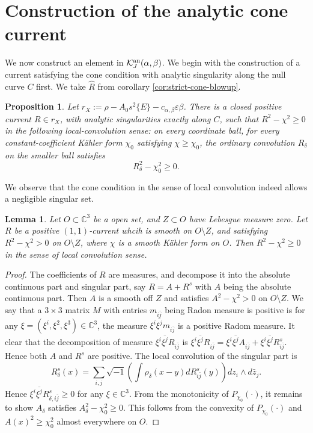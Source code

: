 \documentclass[reqno]{amsart}
\theoremstyle{remark}
\def\C{\mathbb{C}}
\newcommand{\cab}{c_{\alpha,\beta}}
\def\cK{{\mathcal K}}
\theoremstyle{plain}
\newtheorem{prop}[thm]{Proposition}
\newtheorem{lemma}[thm]{Lemma}
\begin{document}
\section{Construction of the analytic cone current}
We now construct an element in $\cK_{J}^{\rm an}(\alpha,\beta)$. We begin with the construction of a current satisfying the cone condition with analytic singularity along the null curve $C$ first. We take $\widehat{R}$ from corollary \ref{cor:strict-cone-blowup}.

\begin{prop}
\label{prop:analytic-descent}
Let $ r_X:=\rho-A_0s^2\{E\}-\cab\varepsilon\beta$.
There is a closed positive current $R\in r_X$, with analytic
singularities exactly along $C$, such that $ R^2-\chi^2\geq0$ 
in the following local-convolution sense: on every coordinate ball,
for every constant-coefficient K\"ahler form
$\chi_0$ satisfying $\chi\geq\chi_0$, the ordinary convolution
$R_\delta$ on the smaller ball satisfies
\[
 R_\delta^2-\chi_0^2\geq0.
\]
\end{prop}

We observe that the cone condition in the sense of local convolution indeed allows a negligible singular set.
\begin{lemma}\label{lem:convolution-negligible-set}Let $O\subset \C^3$ be a open set, and $Z\subset O$ have Lebesgue measure zero. Let $R$ be a positive $(1,1)$-current whcih is smooth on $O\setminus Z$, and satisfying $R^2-\chi^2>0$ on $O\setminus Z$, where $\chi$ is a smooth K\"ahler form on $O$. Then $R^2-\chi^2\geq 0$ in the sense of local convolution sense.   
\end{lemma}
\begin{proof}
    The coefficients of $R$ are measures, and decompose it into the absolute continuous part and singular part, say $R=A+R^s$ with $A$ being the absolute continuous part. Then $A$ is a smooth off $Z$ and satisfies $A^2-\chi^2>0$ on $O\setminus Z$. We say that a $3\times 3$ matrix $M$ with entries $m_{i\bar j}$ being Radon measure is positive is for any $\xi=(\xi^i,\xi^2,\xi^3)\in \C^3$, the measure $\xi^i\overline{\xi^j}m_{i\bar j}$ is a positive Radom measure. It clear that the decomposition of measure $\xi^i\overline{\xi^j}R_{i\bar j}$ is $\xi^i\overline{\xi^j}R_{i\bar j}=\xi^i\overline{\xi^j}A_{i\bar j}+\xi^i\overline{\xi^j}R^s_{i\bar j}$. Hence both $A$ and $R^s$ are positive.  The local convolution of the singular part is \[
    R^s_\delta(x)=\sum_{i,j}\sqrt{-1}\left(\int\rho_\delta(x-y)d R^s_{i\bar j}(y)\right)dz_i\wedge d\bar{z}_j.
    \]
    Hence $\xi^i\overline{\xi^j}R^s_{\delta,i\bar j}\geq 0$ for any $\xi\in \C^3$. From the monotonicity of $P_{\chi_0}(\cdot)$, it remains to show $A_\delta$ satisfies $A_{\delta}^2-\chi_0^2\geq 0$. This follows from the convexity of $P_{\chi_0}(\cdot)$ and $A(x)^2\geq \chi_0^2$ almost everywhere on $O$. 
\end{proof}
\end{document}

